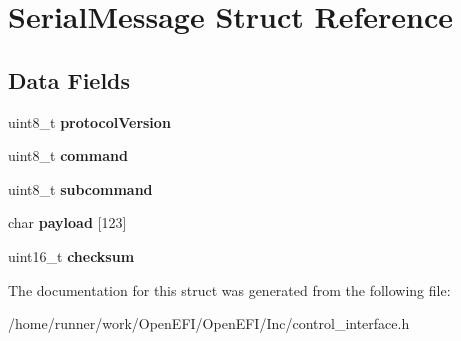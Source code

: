 \hypertarget{structSerialMessage}{}\section{Serial\+Message Struct Reference}
\label{structSerialMessage}
\subsection*{Data Fields}
\begin{DoxyCompactItemize}
\item 
\mbox{\label{structSerialMessage_aa41cdf6c9d8001119b5be27070271b98}} 
uint8\+\_\+t {\bfseries protocol\+Version}
\item 
\mbox{\label{structSerialMessage_a71592aeef849dda1b4e5fddbb739607b}} 
uint8\+\_\+t {\bfseries command}
\item 
\mbox{\label{structSerialMessage_a5417ab8ac06f6d763b4c3edf398e8319}} 
uint8\+\_\+t {\bfseries subcommand}
\item 
\mbox{\label{structSerialMessage_a14f2756e0f5ed02b81b3c6efd55b579e}} 
char {\bfseries payload} \mbox{[}123\mbox{]}
\item 
\mbox{\label{structSerialMessage_aaa01e1797fe94805deb1cc04dc2a7c6a}} 
uint16\+\_\+t {\bfseries checksum}
\end{DoxyCompactItemize}


The documentation for this struct was generated from the following file\+:\begin{DoxyCompactItemize}
\item 
/home/runner/work/\+Open\+E\+F\+I/\+Open\+E\+F\+I/\+Inc/control\+\_\+interface.\+h\end{DoxyCompactItemize}
